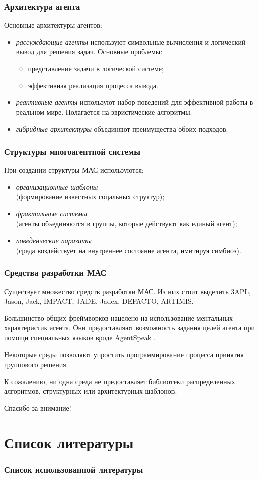 \documentclass{beamer}
\begin{document}
\begin{frame}
  \frametitle{Архитектура агента}
  Основные архитектуры агентов:
  \begin{itemize}
    \item {\it рассуждающие агенты} используют символьные вычисления
      и логический вывод для решения задач. Основные проблемы:
      \begin{itemize}
        \item представление задачи в логической системе;
        \item эффективная реализация процесса вывода.
      \end{itemize}
    \item {\it реактивные агенты} используют набор поведений для
      эффективной работы в реальном мире. Полагается на эвристические
      алгоритмы.
    \item {\it гибридные архитектуры} объединяют преимущества обоих подходов.
  \end{itemize}
\end{frame}

\begin{frame}
  \frametitle{Структуры многоагентной системы}
  При создании структуры МАС используются:
  \begin{itemize}
    \item {\it организационные шаблоны} \\
      (формирование известных соцальных структур);
    \item {\it фрактальные системы} \\
      (агенты объединяются в группы, которые действуют как единый агент);
    \item {\it поведенческие паразиты} \\
      (среда воздействует на внутреннее состояние агента, имитируя симбиоз).
  \end{itemize}
\end{frame}

\begin{frame}
  \frametitle{Средства разработки МАС}
  Существует множество средств разработки МАС. Из них стоит выделить
  3APL, Jason, Jack, IMPACT, JADE, Jadex, DEFACTO, ARTIMIS.

  Большинство общих фреймворков нацелено на использование ментальных
  характеристик агента. Они предоставляют возможность задания целей
  агента при помощи специальных языков вроде AgentSpeak \cite{Rao1996}.

  Некоторые среды позволяют упростить программирование процесса принятия
  группового решения.

  К сожалению, ни одна среда не предоставляет библиотеки
  распределенных алгоритмов, структурных или архитектурных шаблонов.
\end{frame}

\begin{frame}{}
\addtocounter{framenumber}{-1}
\begin{center}
\LARGE{Спасибо за внимание!}
\end{center}
\end{frame}

\section{Список литературы}

\begin{frame}[allowframebreaks]
  \frametitle{Список использованной литературы}
  
  
\end{frame}
\end{document}
